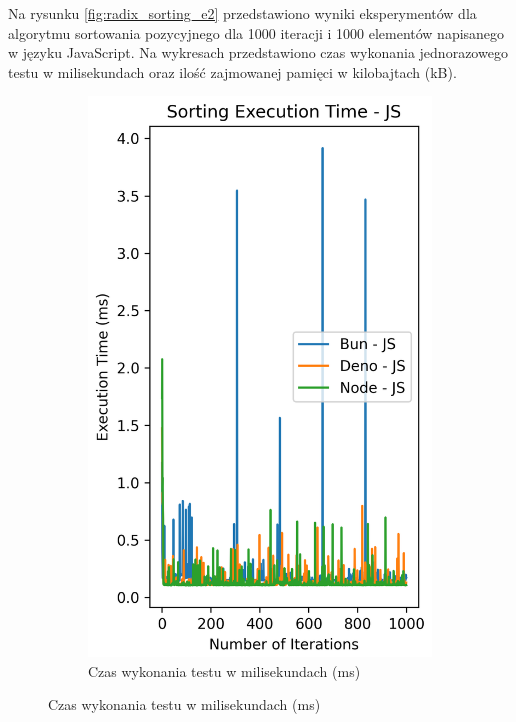 Na rysunku \ref{fig:radix_sorting_e2} przedstawiono wyniki eksperymentów dla algorytmu sortowania pozycyjnego dla 1000 iteracji i 1000 elementów napisanego w języku JavaScript. Na wykresach przedstawiono czas wykonania jednorazowego testu w milisekundach oraz ilość zajmowanej pamięci w kilobajtach (kB).

\begin{figure}[H]
  \centering
  \begin{subfigure}[b]{0.44\textwidth}
    \centering
    \includegraphics[width=\textwidth]{Figures/sorting/sorting_radix_1000_1000_js_time.png}
    \caption{Czas wykonania testu w milisekundach (ms)}
    \label{fig:radix_sorting_e2_time}

\end{subfigure}
\end{figure}
